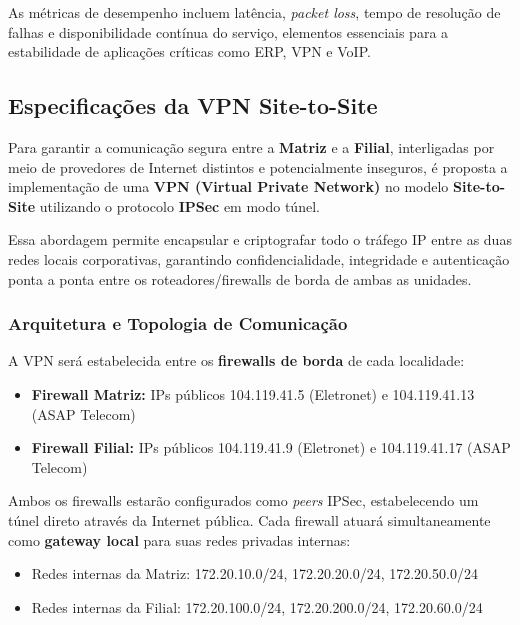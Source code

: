 \documentclass[a4paper, 12pt]{article}
\begin{document}
As métricas de desempenho incluem latência, \textit{packet loss}, tempo de resolução de falhas e disponibilidade contínua do serviço, elementos essenciais para a estabilidade de aplicações críticas como ERP, VPN e VoIP.

\subsection{Especificações da VPN Site-to-Site}
\label{subsec:vpn}

Para garantir a comunicação segura entre a \textbf{Matriz} e a \textbf{Filial}, interligadas por meio de provedores de Internet distintos e potencialmente inseguros, é proposta a implementação de uma \textbf{VPN (Virtual Private Network)} no modelo \textbf{Site-to-Site} utilizando o protocolo \textbf{IPSec} em modo túnel. 

Essa abordagem permite encapsular e criptografar todo o tráfego IP entre as duas redes locais corporativas, garantindo confidencialidade, integridade e autenticação ponta a ponta entre os roteadores/firewalls de borda de ambas as unidades.

\subsubsection{Arquitetura e Topologia de Comunicação}
\label{subsubsec:vpn-topology}

A VPN será estabelecida entre os \textbf{firewalls de borda} de cada localidade:
\begin{itemize}
    \item \textbf{Firewall Matriz:} IPs públicos 104.119.41.5 (Eletronet) e 104.119.41.13 (ASAP Telecom)
    \item \textbf{Firewall Filial:} IPs públicos 104.119.41.9 (Eletronet) e 104.119.41.17 (ASAP Telecom)
\end{itemize}

Ambos os firewalls estarão configurados como \textit{peers} IPSec, estabelecendo um túnel direto através da Internet pública. Cada firewall atuará simultaneamente como \textbf{gateway local} para suas redes privadas internas:
\begin{itemize}
    \item Redes internas da Matriz: 172.20.10.0/24, 172.20.20.0/24, 172.20.50.0/24
    \item Redes internas da Filial: 172.20.100.0/24, 172.20.200.0/24, 172.20.60.0/24
\end{itemize}
\end{document}
